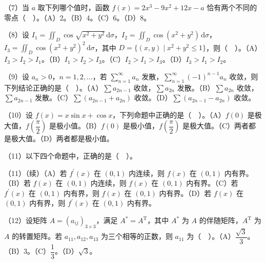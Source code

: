 \documentclass[UTF8,12pt]{ctexart}
\begin{document}
（7）当 \(\displaystyle a\) 取下列哪个值时，函数 \(\displaystyle f(x)=2x^3-9x^2+12x-a\) 恰有两个不同的零点（　）。（A）2。（B）4。（C）6。（D）8。


（8）设 \(\displaystyle I_1=\displaystyle \iint_D\cos\sqrt{x^2+y^2}\,\mathrm d\sigma\)，\(\displaystyle I_2=\displaystyle \iint_D\cos(x^2+y^2)\,\mathrm d\sigma\)，\(\displaystyle I_3=\displaystyle \iint_D\cos(x^2+y^2)^2\,\mathrm d\sigma\)，其中 \(\displaystyle D=\{(x,\allowbreak y)\mid x^2+y^2\le1\}\)，则（　）。（A）\(\displaystyle I_3>I_2>I_1\)。（B）\(\displaystyle I_1>I_2>I_3\)。（C）\(\displaystyle I_2>I_1>I_3\)。（D）\(\displaystyle I_3>I_1>I_2\)。


（9）设 \(\displaystyle a_n>0\)，\(\displaystyle n=1,\allowbreak 2,\allowbreak \ldots\)，若 \(\displaystyle \sum_{n=1}^{\infty}a_n\) 发散，\(\displaystyle \sum_{n=1}^{\infty}(-1)^{n-1}a_n\) 收敛，则下列结论正确的是（　）。（A）\(\displaystyle \sum a_{2n-1}\) 收敛，\(\displaystyle \sum a_{2n}\) 发散。（B）\(\displaystyle \sum a_{2n}\) 收敛，\(\displaystyle \sum a_{2n-1}\) 发散。（C）\(\displaystyle \sum(a_{2n-1}+a_{2n})\) 收敛。（D）\(\displaystyle \sum(a_{2n-1}-a_{2n})\) 收敛。


（10）设 \(\displaystyle f(x)=x\sin x+\cos x\)，下列命题中正确的是（　）。（A）\(\displaystyle f(0)\) 是极大值，\(\displaystyle f(\dfrac{\displaystyle \pi}{\displaystyle 2})\) 是极小值。（B）\(\displaystyle f(0)\) 是极小值，\(\displaystyle f(\dfrac{\displaystyle \pi}{\displaystyle 2})\) 是极大值。（C）两者都是极大值。（D）两者都是极小值。


（11）以下四个命题中，正确的是（　）。


（11）（续）（A）若 \(\displaystyle f^{\prime}(x)\) 在 \(\displaystyle (0,\allowbreak 1)\) 内连续，则 \(\displaystyle f(x)\) 在 \(\displaystyle (0,\allowbreak 1)\) 内有界。（B）若 \(\displaystyle f(x)\) 在 \(\displaystyle (0,\allowbreak 1)\) 内连续，则 \(\displaystyle f(x)\) 在 \(\displaystyle (0,\allowbreak 1)\) 内有界。（C）若 \(\displaystyle f^{\prime}(x)\) 在 \(\displaystyle (0,\allowbreak 1)\) 内有界，则 \(\displaystyle f(x)\) 在 \(\displaystyle (0,\allowbreak 1)\) 内有界。（D）若 \(\displaystyle f(x)\) 在 \(\displaystyle (0,\allowbreak 1)\) 内有界，则 \(\displaystyle f^{\prime}(x)\) 在 \(\displaystyle (0,\allowbreak 1)\) 内有界。


（12）设矩阵 \(\displaystyle A=(a_{ij})_{3\times3}\)，满足 \(\displaystyle A^*=A^{\mathrm T}\)，其中 \(\displaystyle A^*\) 为 \(\displaystyle A\) 的伴随矩阵，\(\displaystyle A^{\mathrm T}\) 为 \(\displaystyle A\) 的转置矩阵。若 \(\displaystyle a_{11},\allowbreak a_{12},\allowbreak a_{13}\) 为三个相等的正数，则 \(\displaystyle a_{11}\) 为（　）。（A）\(\displaystyle \dfrac{\displaystyle \sqrt3}{\displaystyle 3}\)。（B）\(\displaystyle 3\)。（C）\(\displaystyle \dfrac{\displaystyle 1}{\displaystyle 3}\)。（D）\(\displaystyle \sqrt3\)。
\end{document}
